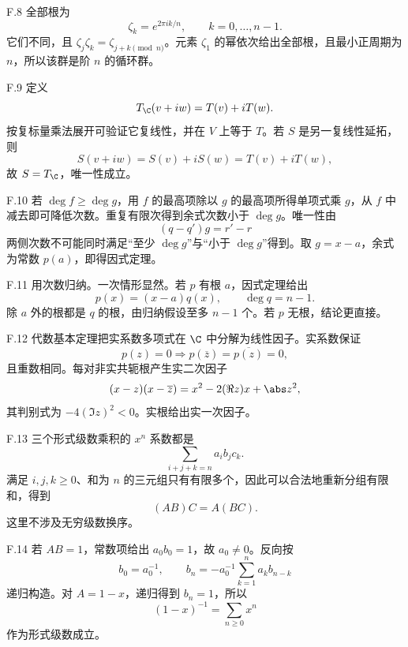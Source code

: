 \begin{solution}{F.8}
全部根为
\[
 \zeta_k=e^{2\pi ik/n},\qquad k=0,\ldots,n-1.
\]
它们不同，且 \(\zeta_j\zeta_k=\zeta_{j+k\pmod n}\)。元素 \(\zeta_1\) 的幂依次给出全部根，且最小正周期为 \(n\)，所以该群是阶 \(n\) 的循环群。
\end{solution}

\begin{solution}{F.9}
定义
\[
 T_\C(v+iw)=T(v)+iT(w).
\]
按复标量乘法展开可验证它复线性，并在 \(V\) 上等于 \(T\)。若 \(S\) 是另一复线性延拓，则
\[
 S(v+iw)=S(v)+iS(w)=T(v)+iT(w),
\]
故 \(S=T_\C\)，唯一性成立。
\end{solution}

\begin{solution}{F.10}
若 \(\deg f\ge\deg g\)，用 \(f\) 的最高项除以 \(g\) 的最高项所得单项式乘 \(g\)，从 \(f\) 中减去即可降低次数。重复有限次得到余式次数小于 \(\deg g\)。唯一性由
\[
 (q-q')g=r'-r
\]
两侧次数不可能同时满足“至少 \(\deg g\)”与“小于 \(\deg g\)”得到。取 \(g=x-a\)，余式为常数 \(p(a)\)，即得因式定理。
\end{solution}

\begin{solution}{F.11}
用次数归纳。一次情形显然。若 \(p\) 有根 \(a\)，因式定理给出
\[
 p(x)=(x-a)q(x),\qquad \deg q=n-1.
\]
除 \(a\) 外的根都是 \(q\) 的根，由归纳假设至多 \(n-1\) 个。若 \(p\) 无根，结论更直接。
\end{solution}

\begin{solution}{F.12}
代数基本定理把实系数多项式在 \(\C\) 中分解为线性因子。实系数保证
\[
 p(z)=0\Longrightarrow p(\overline z)=\overline{p(z)}=0,
\]
且重数相同。每对非实共轭根产生实二次因子
\[
 (x-z)(x-\overline z)
 =x^2-2(\Re z)x+\abs z^2,
\]
其判别式为 \(-4(\Im z)^2<0\)。实根给出实一次因子。
\end{solution}

\begin{solution}{F.13}
三个形式级数乘积的 \(x^n\) 系数都是
\[
 \sum_{i+j+k=n}a_ib_jc_k.
\]
满足 \(i,j,k\ge0\)、和为 \(n\) 的三元组只有有限多个，因此可以合法地重新分组有限和，得到
\[
 (AB)C=A(BC).
\]
这里不涉及无穷级数换序。
\end{solution}

\begin{solution}{F.14}
若 \(AB=1\)，常数项给出 \(a_0b_0=1\)，故 \(a_0\ne0\)。反向按
\[
 b_0=a_0^{-1},\qquad
 b_n=-a_0^{-1}\sum_{k=1}^na_kb_{n-k}
\]
递归构造。对 \(A=1-x\)，递归得到 \(b_n=1\)，所以
\[
 (1-x)^{-1}=\sum_{n\ge0}x^n
\]
作为形式级数成立。
\end{solution}

